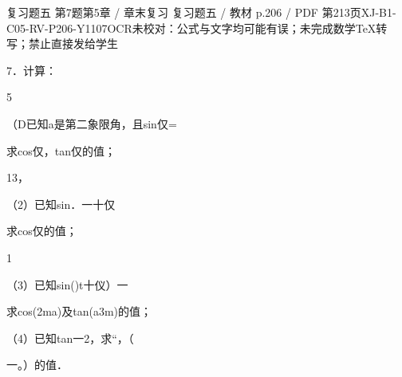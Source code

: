 \begin{bankitem}{复习题五 第7题}{第5章 / 章末复习 复习题五 / 教材 p.206 / PDF 第213页}{XJ-B1-C05-RV-P206-Y1107}{OCR未校对：公式与文字均可能有误；未完成数学TeX转写；禁止直接发给学生}
\begin{ocrdraft}
\par
7．计算：
\par
5
\par
（D已知a是第二象限角，且sin仅=
\par
求cos仅，tan仅的值；
\par
13，
\par
（2）已知sin．一十仅
\par
求cos仅的值；
\par
1
\par
（3）已知sin()t十仪）一
\par
求cos(2ma)及tan(a3m)的值；
\par
（4）已知tan一2，求“，（
\par
一。）的值．
\end{ocrdraft}
\end{bankitem}
